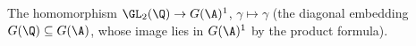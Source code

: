The homomorphism $\GL_2(\Q)\to G(\A)^1$, $\gamma\mapsto\gamma$ (the diagonal embedding $G(\Q)\subseteq G(\A)$, whose image lies in
$G(\A)^1$ by the product formula).
